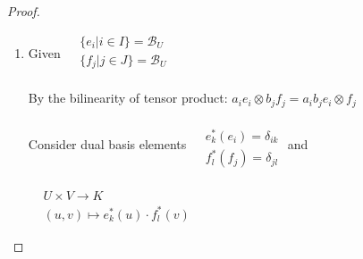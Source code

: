 \documentclass[11pt]{amsart}
\theoremstyle{definition}
\begin{document}
\begin{proof}
\begin{enumerate}
Define $\begin{aligned} & \quad \\
  & \Psi : B(V, W) \to V^* \otimes W^* \\
  & \Phi(b) = b(e_k,  f_l) \epsilon^k \otimes \varphi^l
\end{aligned}$

\[
\begin{gathered}
  \Psi \widetilde{\Phi}(\tau) = \widetilde{\Phi}(\tau)(e_k , f_l) \epsilon^k \otimes \varphi^l = \tau_{ij} \widetilde{\Phi}(\epsilon^i \otimes \varphi^j)(e_k , f_l) \epsilon^k \otimes \varphi^l = \tau_{ij} \Phi( \epsilon^i , \varphi^j) (e_k , f_l) \epsilon^k \otimes \varphi^l = \\
= \tau_{ij} \epsilon^i(e_k) \varphi^j(f_l) \epsilon^k\otimes \varphi^l = \tau_{kl} \epsilon^k \otimes \varphi^l = \tau
\end{gathered}
\]

For $\begin{aligned} & \quad \\
  & v \in V \\
  & w \in W \end{aligned}$
\[
\begin{gathered}
  \widetilde{\Phi} \circ \Psi(b)(v,w) = \widetilde{\Phi} b(e_j,f_k) \epsilon^j \otimes \varphi^k(v,w) = b(e_j , f_k) \widetilde{\Phi}(\epsilon^j \otimes \varphi^k)(v,w) = \\
  = b(e_j, f_k) \Phi(e^i, \varphi^k)(v,w) = b(e_j, f_k) e^i(v) \varphi^k(w) = b(e_j, f_k) v^i \varphi^k = b(v,w)
\end{gathered}
\]

\item[(b)]
Given $\begin{aligned}
  & \lbrace e_i | i \in I \rbrace = \mathcal{B}_U \\
  & \lbrace f_j | j \in J \rbrace = \mathcal{B}_U \\
\end{aligned}$

By the bilinearity of tensor product: $a_i e_i \otimes b_j f_j  = a_i b_j e_i \otimes f_j$

Consider dual basis elements $\begin{aligned} & \quad \\
  & e^*_k(e_i) = \delta_{ik} \\
   & f^*_l(f_j) = \delta_{jl} \end{aligned}$ and \quad

$\begin{aligned} & \quad \\
  & U \times V \to K \\
  & (u,v) \mapsto e^*_k(u) \cdot f^*_l(v) \end{aligned}$


\end{enumerate}
\end{proof}
\end{document}
